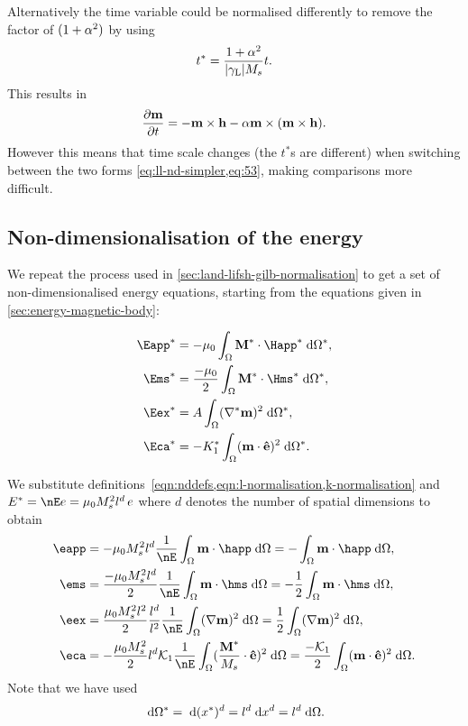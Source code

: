Alternatively the time variable could be normalised differently to remove the factor of $(1 + \alpha^2)$ by using
\begin{equation}
  t^* = \frac{1 + \alpha^2}{{\left|{\gamma_{\mathrm{\tiny{L}}}} \right|} M_s} t.
\end{equation}
This results in
\begin{equation}
  \frac{\partial \boldsymbol{\mathrm{m}}}{\partial t} = -\boldsymbol{\mathrm{m}} \times \boldsymbol{\mathrm{h}} -\alpha \boldsymbol{\mathrm{m}} \times {\left( \boldsymbol{\mathrm{m}}\times \boldsymbol{\mathrm{h}}\right)}.
  \label{eq:ll-nd-simpler}
\end{equation}
However this means that time scale changes (\ie the $t^*$s are different) when switching between the two forms \cref{eq:ll-nd-simpler,eq:53}, making comparisons more difficult.


\subsection{Non-dimensionalisation of the energy}
\label{sec:energy-calculations}

We repeat the process used in \cref{sec:land-lifsh-gilb-normalisation} to get a set of non-dimensionalised energy equations, starting from the equations given in \cref{sec:energy-magnetic-body}:

\begin{align}
  \Eapp^* &= - \mu_0 \int_{\magd} \Mv^* \cdot \Happ^* \d \magd^*,\\
  \Ems^* &=  \frac{-\mu_0}{2} \int_{\magd} \Mv^* \cdot \Hms^* \d \magd^*,\\
  \Eex^* &=  \Exchc \int_{\magd} (\grad^* \mv)^2 \d \magd^*,\\
  \Eca^* &=  -\Kone^* \int_\magd (\mv \cdot \ev)^2 \d \magd^*.
\end{align}

We substitute definitions~\cref{eqn:nddefs,eqn:l-normalisation,k-normalisation} and $E^* = \nE e = \mu_0 M_s^2 l^d \, e$ where $d$ denotes the number of spatial dimensions to obtain
\begin{align}
  \eapp &= -\mu_0 M_s^2 l^d \frac{1}{\nE} \int_{\magd} \mv \cdot \happ \d \magd
  = - \int_{\magd} \mv \cdot \happ \d \magd,
    \label{eq:nd-e-app} \\
  \ems &= \frac{-\mu_0 M_s^2 l^d}{2} \frac{1}{\nE} \int_{\magd} \mv \cdot \hms \d \magd
  = -\frac{1}{2} \int_{\magd} \mv \cdot \hms \d \magd,
    \label{eq:nd-e-ms} \\
  \eex &=  \frac{\mu_0 M_s^2 l^2}{2} \frac{l^d}{l^2} \frac{1}{\nE} \int_{\magd} (\grad \mv)^2 \d \magd
  = \frac{1}{2} \int_{\magd} (\grad \mv)^2 \d \magd,
    \label{eq:nd-e-ex} \\
  \eca &= - \frac{\mu_0 M_s^2}{2 } l^d \kone \frac{1}{\nE} \int_\magd (\frac{\Mv^*}{M_s} \cdot \ev)^2 \d \magd
  = \frac{-\kone}{2} \int_\magd (\mv \cdot \ev)^2 \d \magd.
  \label{eq:nd-e-ca}
\end{align}
Note that we have used
\begin{equation}
  {\; \mathrm{{d}}} \Omega^* = {\; \mathrm{{d}}} (x^*)^d = l^d {\; \mathrm{{d}}} x^d = l^d {\; \mathrm{{d}}} \Omega.
\end{equation}


